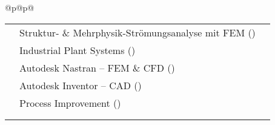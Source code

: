 \begin{tabular}{@{}p{\LeftWidth}@{\hspace{\MidSep}}p{\RightWidth}@{}}
\begin{minipage}[t]{\linewidth}
\begin{tabular}{@{}%
    >{\raggedleft\arraybackslash}m{\Aii}%
    @{\hspace{\ColSep}}%
    >{\RaggedRight\arraybackslash}m{\Bii}%
    @{\hspace{\ColSep}}%
    >{\centering\arraybackslash}m{\Cii}@{}}
  2020 & Struktur- \& Mehrphysik-Strömungsanalyse mit FEM (\inst{https://www.esss.co}{ESSS}) & \cert{https://example.com/zertifikat} \\[\RowTight]
  2019 & Industrial Plant Systems (\inst{https://www.tecsup.edu.pe}{TECSUP}) & \cert{https://example.com/zertifikat} \\[\RowTight]
  2019 & Autodesk Nastran – FEM \& CFD (\inst{https://www.autodesk.com/de}{Autodesk}) & \cert{https://example.com/zertifikat} \\[\RowTight]
  2019 & Autodesk Inventor – CAD (\inst{https://www.autodesk.com/de}{Autodesk}) & \cert{https://example.com/zertifikat} \\[\RowTight]
  2018 & Process Improvement (\inst{https://www.proavance.com}{Proavance}) & \cert{https://example.com/zertifikat} \\[\RowTight]
      &                                                           & \\[-1em]
  \multicolumn{3}{@{}r@{}}{\tiny \textcolor{linksoft}{\textit{Hinweise:} [Z] Zertifikat}}\\
  \end{tabular}
\end{minipage}
\\ %
\end{tabular}